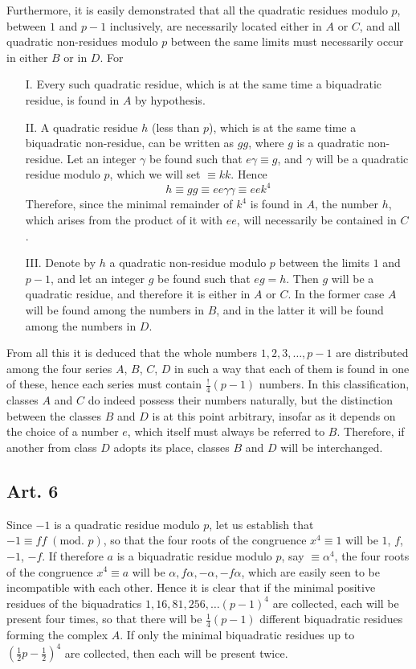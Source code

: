 \documentclass{book}
\theoremstyle{plain}
\theoremstyle{remark}
\begin{document}
Furthermore, it is easily demonstrated that all the quadratic residues modulo $p$, between $1$ and $p-1$ inclusively, are necessarily located either in $A$ or $C$, and all quadratic non-residues modulo $p$ between the same limits must necessarily occur in either $B$ or in $D$.  For
\begin{enumerate}
\item[I.] Every such quadratic residue, which is at the same time a biquadratic residue, is found in $A$ by hypothesis.
\item[II.]  A quadratic residue $h$ (less than $p$), which is at the same time a biquadratic non-residue, can be written as $gg$, where $g$ is a quadratic non-residue.  Let an integer $\gamma$ be found such that $e\gamma \equiv g$, and $\gamma$ will be a quadratic residue modulo $p$, which we will set $\equiv kk$.  Hence 
\[ h \equiv gg \equiv ee\gamma\gamma \equiv eek^4 \]
Therefore, since the minimal remainder of $k^4$ is found in $A$, the number $h$, which arises from the product of it with $ee$, will necessarily be contained in $C$.
\item[III.] Denote by $h$ a quadratic non-residue modulo $p$ between the limits $1$ and $p-1$, and let an integer $g$ be found such that $eg = h$.  Then $g$ will be a quadratic residue, and therefore it is either in $A$ or $C$.  In the former case $A$ will be found among the numbers in $B$, and in the latter it will be found among the numbers in $D$.
\end{enumerate}
From all this it is deduced that the whole numbers $1, 2, 3, \dots, p-1$ are distributed among the four series $A$, $B$, $C$, $D$ in such a way that each of them is found in one of these, hence each series must contain $\tfrac{!}{4}(p-1)$ numbers.   In this classification, classes $A$ and $C$ do indeed possess their numbers naturally, but the distinction between the classes $B$ and $D$ is at this point arbitrary, insofar as it depends on the choice of a number $e$, which itself must always be referred to $B$.  Therefore, if another from class $D$ adopts its place, classes $B$ and $D$ will be interchanged.

\subsection*{Art. 6} 

Since $-1$ is a quadratic residue modulo $p$, let us establish that $-1 \equiv ff \; (\textrm{mod. } p)$, so that the four roots of the congruence $x^4 \equiv 1$ will be $1$, $f$, $-1$, $-f$.  If therefore $a$ is a biquadratic residue modulo $p$, say $\equiv \alpha^4$, the four roots of the congruence $x^4 \equiv a$ will be $\alpha, f\alpha, -\alpha, -f\alpha$, which are easily seen to be incompatible with each other.  Hence it is clear that if the minimal positive residues of the biquadratics $1, 16, 81, 256,\dots (p-1)^4$ are collected, each will be present four times, so that there will be $\tfrac{1}{4}(p-1)$ different biquadratic residues forming the complex $A$.  If only the minimal biquadratic residues up to $(\tfrac{1}{2} p - \tfrac{1}{2})^4$ are collected, then each will be present twice. 
\end{document}
